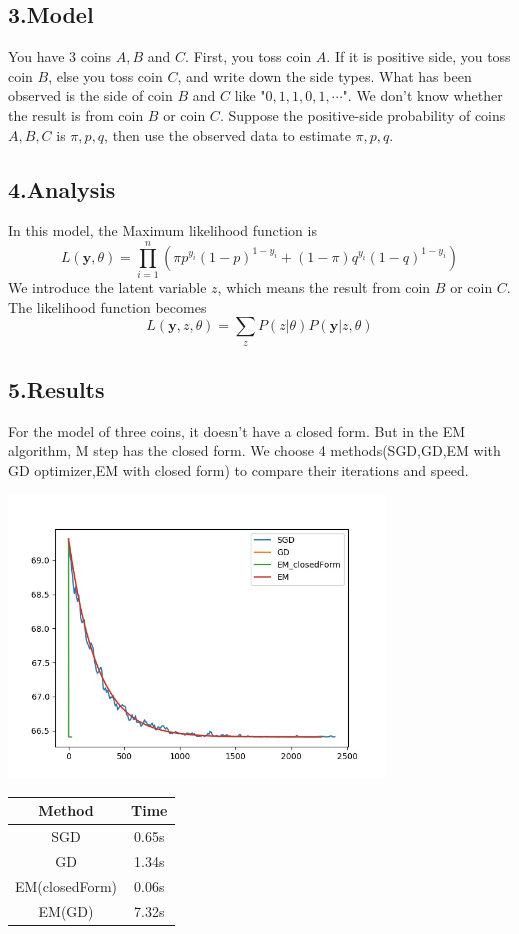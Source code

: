 \documentclass{article}
\begin{document}
\subsection*{3.Model} 
 You have 3 coins $A,B$ and $C$. First, you toss coin $A$. If it is positive side, you toss coin $B$, else you toss coin $C$, and write down the side types. What has been observed is the side of coin $B$ and $C$ like "$0,1,1,0,1,\cdots$". We don't know whether the result is from coin $B$ or coin $C$. Suppose the positive-side probability of coins $A,B,C$ is $\pi,p,q$, then use the observed data to estimate $\pi,p,q$.

\subsection*{4.Analysis}
In this model, the Maximum likelihood function is
$$L(\bm{y},\theta)=\prod_{i=1}^{n}(\pi p^{y_{i}}(1-p)^{1-y_{i}}+(1-\pi)q^{y_{i}}(1-q)^{1-y_{i}})$$
We introduce the latent variable $z$, which means the result from coin $B$ or coin $C$.
The likelihood function becomes $$L(\bm{y},z,\theta)=\sum_{z}P(z|\theta)P(\bm{y}|z,\theta)$$

\subsection*{5.Results}
For the model of three coins, it doesn't have a closed form. But in the EM algorithm, M step has the closed form. We choose 4 methods(SGD,GD,EM with GD optimizer,EM with closed form) to compare their iterations and speed.

\begin{center}
\includegraphics[width=10cm]{sgd.jpg} 
\end{center}


\begin{center}
\begin{tabular}{|c|c|}
\hline
Method & Time\\
\hline
SGD     &         0.65s\\
\hline
GD        &        1.34s\\
\hline
EM(closedForm)     &        0.06s\\
\hline
EM(GD)          &    7.32s\\
\hline
\end{tabular}
\end{center}
\end{document}
